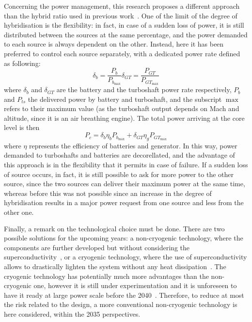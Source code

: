 Concerning the power management, this research proposes a different approach than the hybrid ratio used in previous work~\cite{bib:pornet, bib:isikveren}. 
One of the limit of the degree of hybridisation is the flexibility: in fact, in case of a sudden loss of power, it is still distributed between the sources at the same percentage, and the power demanded to each source is always dependent on the other. 
Instead, here it has been preferred to control each source separately, with a dedicated power rate defined as following:
\begin{subequations}
	\label{eq:power_rates}
	\begin{equation}
		\label{eq:battery_power_rate}
		\delta_b = \frac{P_b}{P_{b_{\max}}}
	\end{equation}
	\begin{equation}
		\label{eq:tshaft_power_rate}
		\delta_{GT} = \frac{P_{GT}}{P_{GT_{\max}}}
	\end{equation}
\end{subequations}
where $\delta_b$ and $\delta_{GT}$ are the battery and the turboshaft power rate respectively, $P_b$ and $P_{ts}$ the delivered power by battery and turboshaft, and the subscript $\max$ refers to their maximum value (as the turboshaft output depends on Mach and altitude, since it is an air breathing engine). 
The total power arriving at the core level is then
\begin{equation}
	\label{eq:total_power_core}
	P_{c} = \delta_b \eta_b P_{b_{\max}} + \delta_{GT} \eta_g P_{GT_{\max}}
\end{equation}
where $\eta$ represents the efficiency of batteries and generator. 
In this way, power demanded to turboshafts and batteries are decorellated, and the advantage of this approach is in the flexibility that it permits in case of failure.
If a sudden loss of source occurs, in fact, it is still possible to ask for more power to the other source, since the two sources can deliver their maximum power at the same time, whereas before this was not possible since an increase in the degree of hybridisation results in a major power request from one source and less from the other one.

Finally, a remark on the technological choice must be done. 
There are two possible solutions for the upcoming years: a non-cryogenic technology, where the components are further developed but without considering the superconductivity~\cite{bib:dever}, or a cryogenic technology, where the use of superconductivity allows to drastically lighten the system without any heat dissipation~\cite{bib:madavan}.
The cryogenic technology has potentially much more advantages than the non-cryogenic one, however it is still under experimentation and it is unforeseen to have it ready at large power scale before the 2040~\cite{bib:brelje_biblio}.
Therefore, to reduce at most the risk related to the design, a more conventional non-cryogenic technology is here considered, within the 2035 perspectives.

